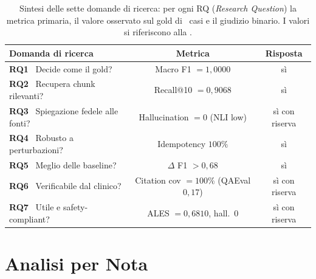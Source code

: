\begin{table}[t]
  \centering
  \caption{Sintesi delle sette domande di ricerca: per ogni RQ (\emph{Research Question}) la metrica primaria, il valore osservato sul gold di \goldn\ casi e il giudizio binario. I valori si riferiscono alla \cleanroomrun.}
  \label{tab:rq-summary}
  \small
  \begin{tabular}{p{}cc}
    \toprule
    Domanda di ricerca & Metrica & Risposta \\
    \midrule
    \textbf{RQ1}~ Decide come il gold? & Macro F1 $=1{,}0000$ & sì \\
    \textbf{RQ2}~ Recupera chunk rilevanti? & Recall@10 $=0{,}9068$ & sì \\
    \textbf{RQ3}~ Spiegazione fedele alle fonti? & Hallucination $=0$ (NLI low) & sì con riserva \\
    \textbf{RQ4}~ Robusto a perturbazioni? & Idempotency $100\%$ & sì \\
    \textbf{RQ5}~ Meglio delle baseline? & $\Delta$ F1 $> 0{,}68$ & sì \\
    \textbf{RQ6}~ Verificabile dal clinico? & Citation cov $=100\%$ (QAEval $0{,}17$) & sì con riserva \\
    \textbf{RQ7}~ Utile e safety-compliant? & ALES $=0{,}6810$, hall.~$0$ & sì con riserva \\
    \bottomrule
  \end{tabular}
\end{table}

\section{Analisi per Nota}
\label{sec:per-nota}

